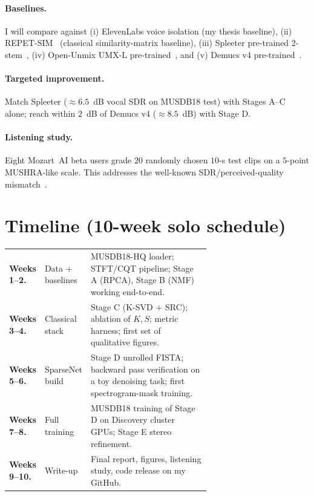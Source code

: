 \documentclass[11pt]{article}
\begin{document}
\paragraph{Baselines.} I will compare against
(i) ElevenLabs voice isolation (my thesis baseline),
(ii) REPET-SIM~\cite{repetsim} (classical similarity-matrix baseline),
(iii) Spleeter pre-trained 2-stem~\cite{spleeter},
(iv) Open-Unmix UMX-L pre-trained~\cite{openunmix}, and
(v) Demucs v4 pre-trained~\cite{demucs}.

\paragraph{Targeted improvement.} Match Spleeter ($\approx 6.5$~dB vocal
SDR on MUSDB18 test) with Stages A--C alone; reach within $2$~dB of
Demucs v4 ($\approx 8.5$~dB) with Stage D.

\paragraph{Listening study.} Eight Mozart~AI beta users grade $20$
randomly chosen $10$-s test clips on a $5$-point MUSHRA-like scale.
This addresses the well-known SDR/perceived-quality
mismatch~\cite{cano2019}.

\section{Timeline (10-week solo schedule)}
\noindent\begin{tabular}{@{}llp{0.66\linewidth}@{}}
\textbf{Weeks 1--2.}  &  Data + baselines & MUSDB18-HQ loader; STFT/CQT
                                            pipeline; Stage A (RPCA),
                                            Stage B (NMF) working
                                            end-to-end.\\
\textbf{Weeks 3--4.}  &  Classical stack  & Stage C (K-SVD + SRC); ablation
                                            of $K, S$; metric harness;
                                            first set of qualitative figures.\\
\textbf{Weeks 5--6.}  &  SparseNet build  & Stage D unrolled FISTA;
                                            backward pass verification on a
                                            toy denoising task; first
                                            spectrogram-mask training.\\
\textbf{Weeks 7--8.}  &  Full training    & MUSDB18 training of Stage D
                                            on Discovery cluster GPUs;
                                            Stage E stereo refinement.\\
\textbf{Weeks 9--10.} &  Write-up         & Final report, figures, listening
                                            study, code release on my
                                            GitHub.
\end{tabular}
\end{document}
